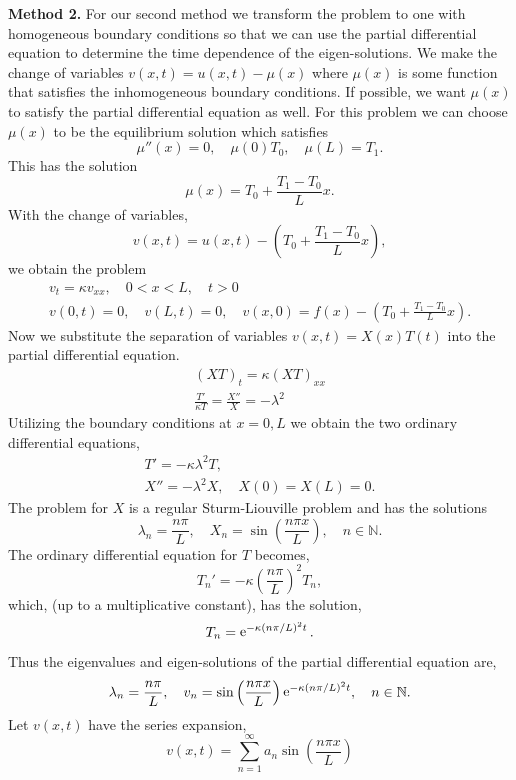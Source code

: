 {\begin{Solution}
  \textbf{Method 2.}
  For our second method we transform the problem to one with homogeneous
  boundary conditions so that we can use the partial differential equation
  to determine the time dependence of the eigen-solutions.
  We make the change of variables $v(x,t) = u(x,t) - \mu(x)$
  where $\mu(x)$ is some function that satisfies the inhomogeneous boundary
  conditions.   If possible, we want $\mu(x)$ to satisfy the partial differential
  equation as well.  For this problem we can choose $\mu(x)$ to be the 
  equilibrium solution which satisfies
  \[
  \mu''(x) = 0, \quad \mu(0) T_0, \quad \mu(L) = T_1.
  \]
  This has the solution
  \[
  \mu(x) = T_0 + \frac{T_1-T_0}{L} x.
  \]
  With the change of variables,
  \[
  v(x,t) = u(x,t) - \left( T_0 + \frac{T_1-T_0}{L} x \right),
  \]
  we obtain the problem
  \begin{gather*}
    v_t = \kappa v_{x x}, \quad 0 < x < L, \quad t > 0 \\
    v(0,t) = 0, \quad v(L,t) = 0, \quad 
    v(x,0) = f(x) - \left( T_0 + \frac{T_1-T_0}{L} x \right).
  \end{gather*}
  Now we substitute the separation of variables $v(x,t) = X(x) T(t)$ into 
  the partial differential equation.
  \begin{gather*}
    (X T)_t = \kappa (X T)_{x x} \\
    \frac{T'}{\kappa T} = \frac{X''}{X} = -\lambda^2
  \end{gather*}
  Utilizing the boundary conditions at $x = 0,L$ we obtain the two ordinary
  differential equations,
  \begin{gather*}
    T' = - \kappa \lambda^2 T, \\
    X'' = - \lambda^2 X, \quad X(0) = X(L) = 0.
  \end{gather*}
  The problem for $X$ is a regular Sturm-Liouville problem and has the solutions
  \[
  \lambda_n = \frac{n\pi}{L}, \quad
  X_n = \sin \left( \frac{n \pi x}{L} \right), \quad n \in \mathbb{N}.
  \]
  The ordinary differential equation for $T$ becomes,
  \[
  T_n' = - \kappa \left( \frac{ n \pi }{L} \right)^2 T_n,
  \]
  which, (up to a multiplicative constant), has the solution,
  \[
  T_n = \mathop{\mathrm{e}}\nolimits^{- \kappa (n \pi / L)^2 t}.
  \]
  Thus the eigenvalues and eigen-solutions of the partial differential 
  equation are,
  \[
  \lambda_n = \frac{n\pi}{L}, \quad
  v_n = \sin \left( \frac{n \pi x}{L} \right) \mathop{\mathrm{e}}\nolimits^{-\kappa (n\pi/L)^2 t}, \quad 
  n \in \mathbb{N}.
  \]
  Let $v(x,t)$ have the series expansion,
  \[
  v(x,t) = \sum_{n=1}^\infty a_n \sin \left( \frac{n \pi x}{L} \right) 
\]
\end{Solution}}
